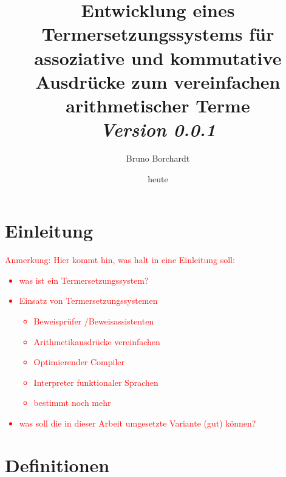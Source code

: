 \documentclass{article}
\title{Entwicklung eines Termersetzungssystems für assoziative und kommutative Ausdrücke zum vereinfachen arithmetischer Terme\\ \textit{Version 0.0.1}}
\author{Bruno Borchardt}
\date{heute}
\begin{document}
\maketitle

\tableofcontents

\clearpage

\section{Einleitung}
\textcolor{red} {
\begin{itshape}
Anmerkung: Hier kommt hin, was halt in eine Einleitung soll:
\begin{itemize}
    \item was ist ein Termersetzungssystem?
    \item Einsatz von Termersetzungssystemen
    \begin{itemize}
        \item Beweisprüfer /Beweisassistenten
        \item Arithmetikausdrücke vereinfachen
        \item Optimierender Compiler
	\item Interpreter funktionaler Sprachen
        \item bestimmt noch mehr
    \end{itemize}
    \item was soll die in dieser Arbeit umgesetzte Variante (gut) können?
\end{itemize}
\end{itshape}
}

\section{Definitionen}
\end{document}
